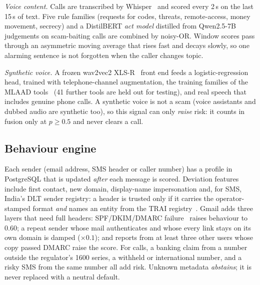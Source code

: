 \documentclass[conference]{IEEEtran}
\begin{document}
\textit{Voice content.} Calls are transcribed by Whisper~\cite{radford2023whisper}
and scored every 2\,s on the last 15\,s of text. Five rule families (requests for
codes, threats, remote-access, money movement, secrecy) and a DistilBERT
\emph{act model} distilled from Qwen2.5-7B~\cite{qwen2025} judgements on
scam-baiting calls are combined by noisy-OR. Window scores pass through an
asymmetric moving average that rises fast and decays slowly, so one alarming
sentence is not forgotten when the caller changes topic.

\textit{Synthetic voice.} A frozen wav2vec2 XLS-R~\cite{babu2022xlsr} front end
feeds a logistic-regression head, trained with telephone-channel augmentation,
the training families of the MLAAD tools~\cite{muller2024mlaad} (41 further tools are held out for testing), and real speech that includes genuine
phone calls. A synthetic voice is not a scam (voice assistants and dubbed audio
are synthetic too), so this signal can only \emph{raise} risk: it counts in
fusion only at $p \ge 0.5$ and never clears a call.

\subsection{Behaviour engine}
Each sender (email address, SMS header or caller number) has a profile in
PostgreSQL that is updated \emph{after} each message is scored. Deviation
features include first contact, new domain, display-name impersonation and,
for SMS, India's DLT sender registry: a header is trusted only if it carries the
operator-stamped format \emph{and} names an entity from the TRAI
registry~\cite{tccpr2018}. Gmail adds three layers that need full headers:
SPF/DKIM/DMARC failure~\cite{rfc7208,rfc6376,rfc7489} raises behaviour to 0.60;
a repeat sender whose mail authenticates and whose every link stays on its own
domain is damped ($\times 0.1$); and reports from at least three other users
whose copy passed DMARC raise the score. For calls, a banking claim from a
number outside the regulator's 1600 series, a withheld or international number,
and a risky SMS from the same number all add risk. Unknown metadata
\emph{abstains}; it is never replaced with a neutral default.
\end{document}

